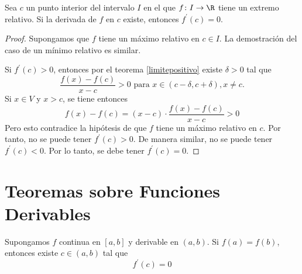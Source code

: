 \begin{theorem}
	\label{extrint}
	Sea \(c \) un punto interior del intervalo \(I \) en el que \(f \colon I \to \R \) tiene un extremo relativo. Si la derivada de \(f \) en \(c \) existe, entonces \(f^\prime (c) = 0\).
\end{theorem}
\begin{proof}
	Supongamos que \(f \) tiene un máximo relativo en \(c \in I\). La demostración del caso de un mínimo relativo es similar.

	Si \(f^\prime (c) > 0\), entonces por el teorema \ref{limitepositivo} existe \(\delta > 0 \) tal que
	\[
		\frac{f(x) - f(c)}{x - c} > 0 \text{ para } x \in (c - \delta, c + \delta), x \neq c.
	\]
	Si \(x \in V\) y \(x > c \), se tiene entonces
	\[
		f(x) - f(c) = (x - c ) \cdot \frac{f(x) - f(c )}{x - c } > 0
	\]
	Pero esto contradice la hipótesis de que \(f \) tiene un máximo relativo en \(c \). Por tanto, no se puede tener \(f^\prime (c) > 0\). De manera similar, no se puede tener \(f^\prime (c) <0 \). Por lo tanto, se debe tener \(f^\prime (c) = 0\).
\end{proof}

\section{Teoremas sobre Funciones Derivables}
\begin{theorem}[de Rolle]
	Supongamos \(f \) continua en \([a,b ]\) y derivable en \((a,b )\). Si \(f(a) = f(b )\), entonces existe \(c \in (a,b )\) tal que
	\[
		f^\prime (c) = 0
	\]
\end{theorem}

